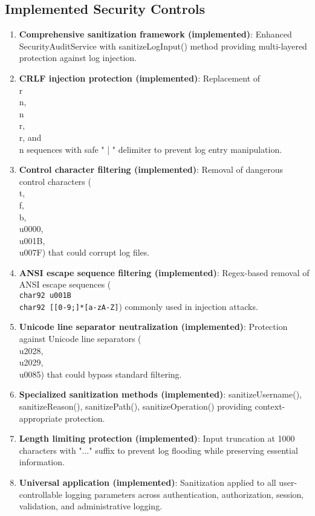 \documentclass[]{UCD_CS_FYP_Report}
\begin{document}
\subsection{Implemented Security Controls}
\begin{enumerate}
	\item \textbf{Comprehensive sanitization framework (implemented)}: Enhanced SecurityAuditService with sanitizeLogInput() method providing multi-layered protection against log injection.
	\item \textbf{CRLF injection protection (implemented)}: Replacement of \\r\\n, \\n\\r, \\r, and \\n sequences with safe " | " delimiter to prevent log entry manipulation.
	\item \textbf{Control character filtering (implemented)}: Removal of dangerous control characters (\\t, \\f, \\b, \\u0000, \\u001B, \\u007F) that could corrupt log files.
	\item \textbf{ANSI escape sequence filtering (implemented)}: Regex-based removal of ANSI escape sequences (\texttt{\\char92 u001B\\char92 [[0-9;]*[a-zA-Z]}) commonly used in injection attacks.
	\item \textbf{Unicode line separator neutralization (implemented)}: Protection against Unicode line separators (\\u2028, \\u2029, \\u0085) that could bypass standard filtering.
	\item \textbf{Specialized sanitization methods (implemented)}: sanitizeUsername(), sanitizeReason(), sanitizePath(), sanitizeOperation() providing context-appropriate protection.
	\item \textbf{Length limiting protection (implemented)}: Input truncation at 1000 characters with "..." suffix to prevent log flooding while preserving essential information.
	\item \textbf{Universal application (implemented)}: Sanitization applied to all user-controllable logging parameters across authentication, authorization, session, validation, and administrative logging.
\end{enumerate}
\end{document}

